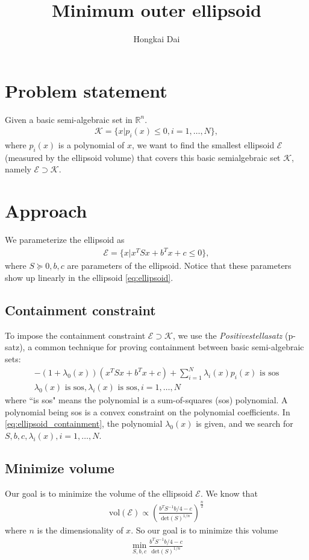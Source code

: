 \documentclass{article}
\title{Minimum outer ellipsoid}
\author{Hongkai Dai}
\date{}
\begin{document}
\maketitle
\section{Problem statement}
Given a basic semi-algebraic set in $\mathbb{R}^n$.
\begin{align}
	\mathcal{K} = \{x | p_i(x) \le 0, i=1,\hdots, N\},
\end{align}
where $p_i(x)$ is a polynomial of $x$, we want to find the smallest ellipsoid $\mathcal{E}$ (measured by the ellipsoid volume) that covers this basic semialgebraic set $\mathcal{K}$, namely $\mathcal{E}\supset\mathcal{K}$.

\section{Approach}
We parameterize the ellipsoid as
\begin{align}
	\mathcal{E} = \{x | x^TSx+b^Tx+c\le 0\} \label{eq:ellipsoid},
\end{align}
where $S\succeq 0, b, c$ are parameters of the ellipsoid. Notice that these parameters show up linearly in the ellipsoid \eqref{eq:ellipsoid}.

\subsection{Containment constraint}
To impose the containment constraint $\mathcal{E}\supset\mathcal{K}$, we use the \textit{Positivestellasatz} (p-satz), a common technique for proving containment between basic semi-algebraic sets:
\begin{subequations}
\begin{align}
	-(1+\lambda_0(x))(x^TSx + b^Tx + c) + \sum_{i=1}^N \lambda_i(x) p_i(x) \text{ is sos}\\
	\lambda_0(x) \text{ is sos}, \lambda_i(x) \text{ is sos}, i=1,\hdots, N
\end{align}
	\label{eq:ellipsoid_containment}
\end{subequations}
where ``is sos" means the polynomial is a sum-of-squares (sos) polynomial. A polynomial being sos is a convex constraint on the polynomial coefficients. In \eqref{eq:ellipsoid_containment}, the polynomial $\lambda_0(x)$ is given, and we search for $S, b, c, \lambda_i(x), i=1,\hdots, N$.

\subsection{Minimize volume}
Our goal is to minimize the volume of the ellipsoid $\mathcal{E}$. We know that
\begin{align}
	\text{vol}(\mathcal{E})\propto\left(\frac{b^TS^{-1}b/4-c}{\text{det}(S)^{1/n}}\right)^{\frac{n}{2}} \label{eq:ellipsoid_volume}
\end{align}
where $n$ is the dimensionality of $x$. So our goal is to minimize this volume
\begin{align}
	\min_{S, b, c} \frac{b^TS^{-1}b/4-c}{\text{det}(S)^{1/n}} \label{eq:minimize_volume}
\end{align}
\end{document}
